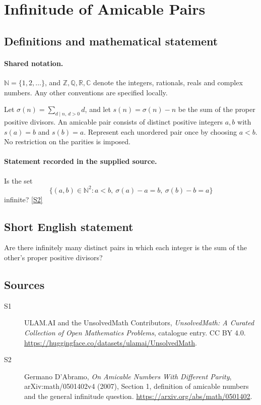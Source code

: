 \documentclass[11pt]{article}
\newcommand{\sref}[2]{\hyperlink{source:#1:#2}{[S#2]}}
\begin{document}
\section{Infinitude of Amicable Pairs}\label{statement}

\subsection{Definitions and mathematical statement}

\paragraph{Shared notation.}$\mathbb N=\{1,2,\ldots\}$, and $\mathbb Z,\mathbb Q,\mathbb R,\mathbb C$ denote the integers, rationals, reals and complex numbers. Any other conventions are specified locally.


Let \(\sigma(n)=\sum_{d\mid n,\,d>0}d\), and let
\(s(n)=\sigma(n)-n\) be the sum of the proper positive divisors.
An amicable pair consists of distinct positive integers \(a,b\)
with \(s(a)=b\) and \(s(b)=a\). Represent each unordered pair
once by choosing \(a<b\). No restriction on the parities is imposed.
\paragraph{Statement recorded in the supplied source.}
Is the set
\[
 \{(a,b)\in\mathbb N^2:a<b,\ \sigma(a)-a=b,\ \sigma(b)-b=a\}
\]
infinite? \sref{statement}{2}
\subsection{Short English statement}
Are there infinitely many distinct pairs in which each integer is the sum of the other's proper positive divisors?
\subsection{Sources}
\begin{description}
\item[\hypertarget{source:statement:1}{S1}] ULAM.AI and the UnsolvedMath Contributors, \emph{UnsolvedMath: A Curated Collection of Open Mathematics Problems}, catalogue entry. CC BY 4.0. \url{https://huggingface.co/datasets/ulamai/UnsolvedMath}.
\item[\hypertarget{source:statement:2}{S2}] Germano D'Abramo, \emph{On Amicable Numbers With Different Parity}, arXiv:math/0501402v4 (2007), Section 1, definition of amicable numbers and the general infinitude question. \url{https://arxiv.org/abs/math/0501402}.
\end{description}
\label{end:statement}
\end{document}
